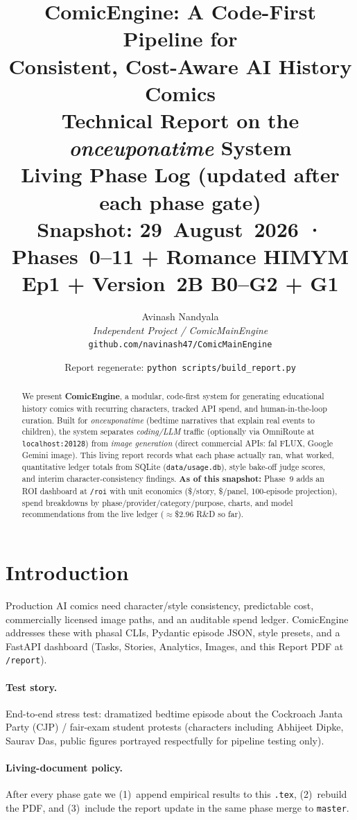 \documentclass[10pt,twocolumn,letterpaper]{article}
\title{\vspace{-1.2em}
\textbf{ComicEngine: A Code-First Pipeline for\\
Consistent, Cost-Aware AI History Comics}\\[0.4em]
\large Technical Report on the \emph{onceuponatime} System\\[0.3em]
\normalsize Living Phase Log (updated after each phase gate)\\[0.2em]
\normalsize Snapshot: 29~August~2026 · Phases~0--11 + Romance HIMYM Ep1 + Version~2B B0--G2 + G1
\vspace{-0.6em}}
\author{
Avinash Nandyala\\
\textit{Independent Project / ComicMainEngine}\\
\texttt{github.com/navinash47/ComicMainEngine}
}
\date{Report regenerate: \texttt{python scripts/build\_report.py}}
\begin{document}
\maketitle
\thispagestyle{empty}

\begin{abstract}
We present \textbf{ComicEngine}, a modular, code-first system for generating educational history comics with recurring characters, tracked API spend, and human-in-the-loop curation.
Built for \emph{onceuponatime} (bedtime narratives that explain real events to children), the system separates \emph{coding/LLM} traffic (optionally via OmniRoute at \texttt{localhost:20128}) from \emph{image generation} (direct commercial APIs: fal FLUX, Google Gemini image).
This living report records what each phase actually ran, what worked, quantitative ledger totals from SQLite (\texttt{data/usage.db}), style bake-off judge scores, and interim character-consistency findings.
\textbf{As of this snapshot:} Phase~9 adds an ROI dashboard at \texttt{/roi} with unit economics (\$/story, \$/panel, 100-episode projection), spend breakdowns by phase/provider/category/purpose, charts, and model recommendations from the live ledger ($\approx$\$2.96 R\&D so far).
\end{abstract}

\section{Introduction}
Production AI comics need character/style consistency, predictable cost, commercially licensed image paths, and an auditable spend ledger.
ComicEngine addresses these with phasal CLIs, Pydantic episode JSON, style presets, and a FastAPI dashboard (Tasks, Stories, Analytics, Images, and this Report PDF at \texttt{/report}).

\paragraph{Test story.}
End-to-end stress test: dramatized bedtime episode about the Cockroach Janta Party (CJP) / fair-exam student protests (characters including Abhijeet Dipke, Saurav Das, public figures portrayed respectfully for pipeline testing only).

\paragraph{Living-document policy.}
After every phase gate we (1)~append empirical results to this \texttt{.tex}, (2)~rebuild the PDF, and (3)~include the report update in the same phase merge to \texttt{master}.
\end{document}
